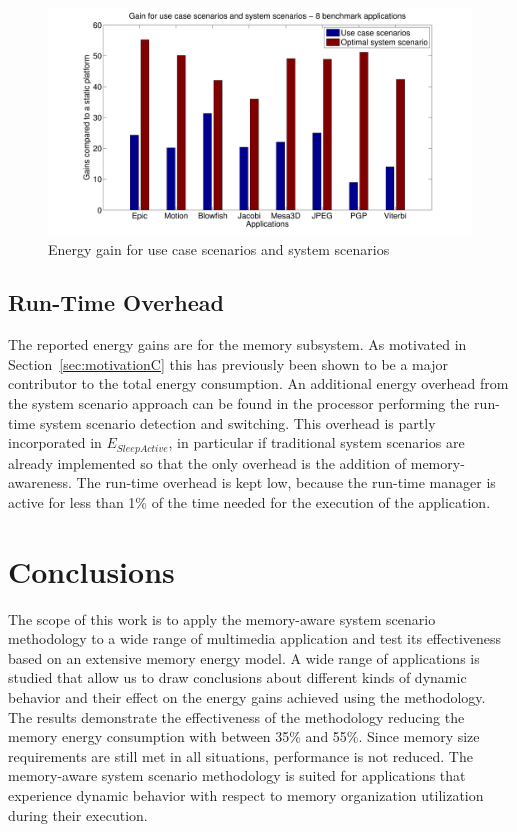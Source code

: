 \begin{figure}
\centering
\includegraphics[width=\textwidth]{C/usecase.pdf}
\caption{Energy gain for use case scenarios and system scenarios}
\label{fig:usecaseC}
\end{figure}

\subsection{Run-Time Overhead}  

The reported energy gains are for the memory subsystem. 
As motivated in Section~\ref{sec:motivationC} this has previously been shown to be a major contributor to the total energy consumption. 
An additional energy overhead from the system scenario approach can be found in the processor performing the run-time system scenario detection and switching. 
This overhead is partly incorporated in $E_{SleepActive}$, in particular if traditional system scenarios are already implemented so that the only overhead is the addition of memory-awareness.
The run-time overhead is kept low, because the run-time manager is active for less than 1\% of the time needed for the execution of the application. 

\section{Conclusions}
\label{sec:conclusionC}

The scope of this work is to apply the memory-aware system scenario methodology to a wide range of multimedia application and test its effectiveness based on an extensive memory energy model. 
A wide range of applications is studied that allow us to draw conclusions about different kinds of dynamic behavior and their effect on the energy gains achieved using the methodology. 
The results demonstrate the effectiveness of the methodology reducing the memory energy consumption with between 35\% and 55\%. 
Since memory size requirements are still met in all situations, performance is not reduced. 
The memory-aware system scenario methodology is suited for applications that experience dynamic behavior with respect to memory organization utilization during their execution.

